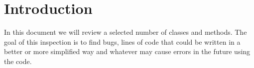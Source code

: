 \section{Introduction}
	
In this document we will review a selected number of classes and methods.
The goal of this inspection is to find bugs, lines of code that could be written in a better or more simplified way and whatever may cause errors in the future using the code.